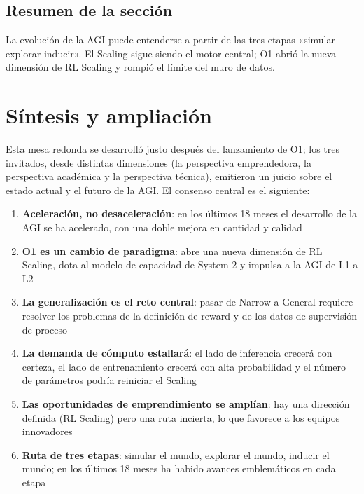 \documentclass[a4paper]{article}
\begin{document}
\subsection{Resumen de la sección}

La evolución de la AGI puede entenderse a partir de las tres etapas «simular-explorar-inducir». El Scaling sigue siendo el motor central; O1 abrió la nueva dimensión de RL Scaling y rompió el límite del muro de datos.

\section{Síntesis y ampliación}

Esta mesa redonda se desarrolló justo después del lanzamiento de O1; los tres invitados, desde distintas dimensiones (la perspectiva emprendedora, la perspectiva académica y la perspectiva técnica), emitieron un juicio sobre el estado actual y el futuro de la AGI. El consenso central es el siguiente:

\begin{enumerate}
\item \textbf{Aceleración, no desaceleración}: en los últimos 18 meses el desarrollo de la AGI se ha acelerado, con una doble mejora en cantidad y calidad
\item \textbf{O1 es un cambio de paradigma}: abre una nueva dimensión de RL Scaling, dota al modelo de capacidad de System 2 y impulsa a la AGI de L1 a L2
\item \textbf{La generalización es el reto central}: pasar de Narrow a General requiere resolver los problemas de la definición de reward y de los datos de supervisión de proceso
\item \textbf{La demanda de cómputo estallará}: el lado de inferencia crecerá con certeza, el lado de entrenamiento crecerá con alta probabilidad y el número de parámetros podría reiniciar el Scaling
\item \textbf{Las oportunidades de emprendimiento se amplían}: hay una dirección definida (RL Scaling) pero una ruta incierta, lo que favorece a los equipos innovadores
\item \textbf{Ruta de tres etapas}: simular el mundo, explorar el mundo, inducir el mundo; en los últimos 18 meses ha habido avances emblemáticos en cada etapa
\end{enumerate}
\end{document}
